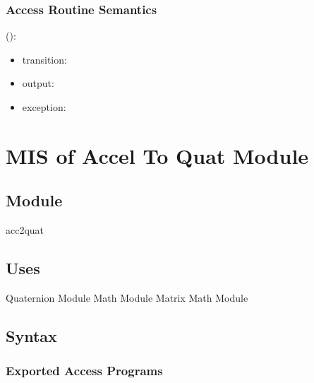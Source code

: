 \documentclass[12pt, titlepage]{article}
\begin{document}

\subsubsection{Access Routine Semantics}

\noindent {}():
\begin{itemize}
\item transition: 
\item output: 
\item exception: 
\end{itemize}


\newpage

\section{MIS of Accel To Quat Module} \label{iqewomm}

\subsection{Module}
acc2quat

\subsection{Uses}
Quaternion Module \newline
Math Module \newline
Matrix Math Module

\subsection{Syntax}

\subsubsection{Exported Access Programs}
\end{document}
